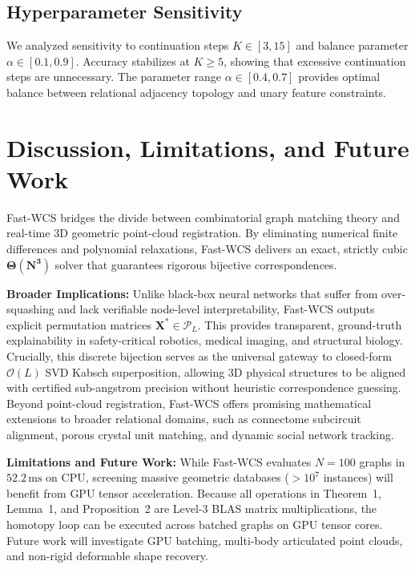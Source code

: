 \documentclass[conference]{IEEEtran}
\begin{document}
\subsection{Hyperparameter Sensitivity}

We analyzed sensitivity to continuation steps $K \in [3, 15]$ and balance parameter $\alpha \in [0.1, 0.9]$. Accuracy stabilizes at $K \geq 5$, showing that excessive continuation steps are unnecessary. The parameter range $\alpha \in [0.4, 0.7]$ provides optimal balance between relational adjacency topology and unary feature constraints.


\section{Discussion, Limitations, and Future Work}
\label{sec:discussion}

Fast-WCS bridges the divide between combinatorial graph matching theory and real-time 3D geometric point-cloud registration. By eliminating numerical finite differences and polynomial relaxations, Fast-WCS delivers an exact, strictly cubic $\mathbf{\Theta(N^3)}$ solver that guarantees rigorous bijective correspondences.

\noindent\textbf{Broader Implications:} Unlike black-box neural networks that suffer from over-squashing and lack verifiable node-level interpretability, Fast-WCS outputs explicit permutation matrices $\mathbf{X}^* \in \mathcal{P}_L$. This provides transparent, ground-truth explainability in safety-critical robotics, medical imaging, and structural biology. Crucially, this discrete bijection serves as the universal gateway to closed-form $\mathcal{O}(L)$ SVD Kabsch superposition, allowing 3D physical structures to be aligned with certified sub-angstrom precision without heuristic correspondence guessing. Beyond point-cloud registration, Fast-WCS offers promising mathematical extensions to broader relational domains, such as connectome subcircuit alignment, porous crystal unit matching, and dynamic social network tracking.

\noindent\textbf{Limitations and Future Work:} While Fast-WCS evaluates $N = 100$ graphs in $52.2\,\text{ms}$ on CPU, screening massive geometric databases ($> 10^7$ instances) will benefit from GPU tensor acceleration. Because all operations in Theorem~1, Lemma~1, and Proposition~2 are Level-3 BLAS matrix multiplications, the homotopy loop can be executed across batched graphs on GPU tensor cores. Future work will investigate GPU batching, multi-body articulated point clouds, and non-rigid deformable shape recovery.
\end{document}
